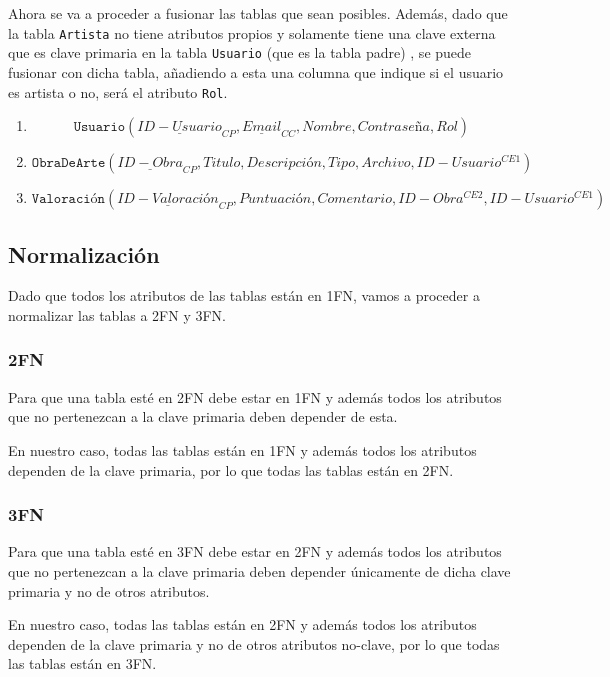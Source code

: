 \vspace{1cm}
Ahora se va a proceder a fusionar las tablas que sean posibles. Además,
dado que la tabla \texttt{Artista} no tiene atributos propios y solamente tiene
una clave externa que es clave primaria en la tabla \texttt{Usuario} (que es la
tabla padre) , se puede fusionar con dicha tabla, añadiendo a esta una columna
que indique si el usuario es artista o no, será el atributo \texttt{Rol}.

\begin{enumerate}
    \item \[ \texttt{Usuario}(\underline{ID-Usuario}_{CP}, \underline{Email}_{CC}, Nombre, Contraseña, Rol) \]
    \item \[ \texttt{ObraDeArte}(\underline{ID-Obra}_{CP}, Titulo, Descripción, Tipo, Archivo, ID-Usuario^{CE1}) \]
    \item \[ \texttt{Valoración}(\underline{ID-Valoración}_{CP}, Puntuación, Comentario, ID-Obra^{CE2}, ID-Usuario^{CE1}) \]
\end{enumerate}

\subsection{Normalización}
Dado que todos los atributos de las tablas están en 1FN, vamos a proceder a
normalizar las tablas a 2FN y 3FN.

\subsubsection{2FN}
Para que una tabla esté en 2FN debe estar en 1FN y además todos los atributos
que no pertenezcan a la clave primaria deben depender de esta.

En nuestro caso, todas las tablas están en 1FN y además todos los atributos
dependen de la clave primaria, por lo que todas las tablas están en 2FN.

\subsubsection{3FN}
Para que una tabla esté en 3FN debe estar en 2FN y además todos los atributos
que no pertenezcan a la clave primaria deben depender únicamente de dicha
clave primaria y no de otros atributos.

En nuestro caso, todas las tablas están en 2FN y además todos los atributos
dependen de la clave primaria y no de otros atributos no-clave, por lo que
todas las tablas están en 3FN.

